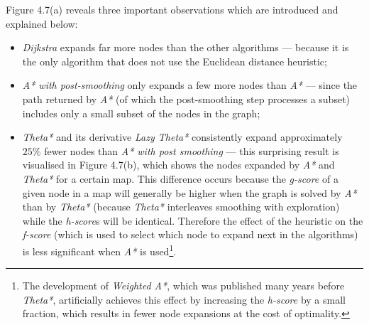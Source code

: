 \documentclass[12pt,notitlepage]{report}
\begin{document}
\noindent
Figure 4.7(a) reveals three important observations which are introduced and explained below:
\begin{itemize}
\item {\em Dijkstra} expands far more nodes than the other algorithms --- because it is the only algorithm that does not use the Euclidean distance heuristic;
\item {\em A* with post-smoothing} only expands a few more nodes than {\em A*} --- since the path returned by {\em A*} (of which the post-smoothing step processes a subset) includes only a small subset of the nodes in the graph;
\item {\em Theta*} and its derivative {\em Lazy Theta*} consistently expand approximately $25\%$ fewer nodes than {\em A* with post smoothing} --- this surprising result is visualised in Figure 4.7(b), which shows the nodes expanded by {\em A*} and {\em Theta*} for a certain map. This difference occurs because the {\em g-score} of a given node in a map will generally be higher when the graph is solved by {\em A*} than by {\em Theta*} (because {\em Theta*} interleaves smoothing with exploration) while the {\em h-score}s will be identical. Therefore the effect of the heuristic on the {\em f-score} (which is used to select which node to expand next in the algorithms) is less significant when {\em A*} is used\footnote{The development of {\em Weighted A*}\cite{Pearl84}, which was published many years before {\em Theta*}, artificially achieves this effect by increasing the {\em h-score} by a small fraction, which results in fewer node expansions at the cost of optimality.}.
\end{itemize}
\end{document}
